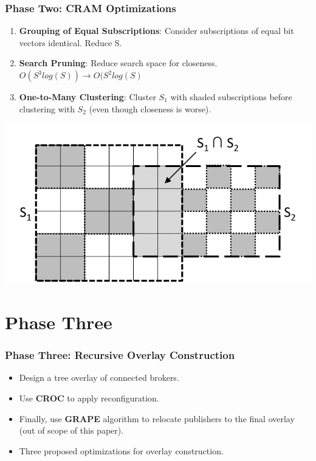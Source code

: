\documentclass{beamer}
\begin{document}
\begin{frame}
\frametitle{Phase Two: CRAM Optimizations}
\begin{enumerate}
\item \textbf{Grouping of Equal Subscriptions}: Consider subscriptions of equal bit vectors identical. Reduce S.
\item \textbf{Search Pruning}: Reduce search space for closeness. $O(S^3log(S)) \rightarrow O(S^2log(S)$
\item \textbf{One-to-Many Clustering}: Cluster $S_1$ with shaded subscriptions before clustering with $S_2$ (even though closeness is worse).
\end{enumerate}

\includegraphics[scale=0.33]{one_to_many.png}

\end{frame}

\section{Phase Three}
\begin{frame}
\frametitle{Phase Three: Recursive Overlay Construction}
\begin{itemize}
\item Design a tree overlay of connected brokers.
\item Use \textbf{CROC} to apply reconfiguration.
\item Finally, use \textbf{GRAPE} algorithm to relocate publishers to the final overlay (out of scope of this paper).
\item Three proposed optimizations for overlay construction.
\end{itemize}
\end{frame}
\end{document}
